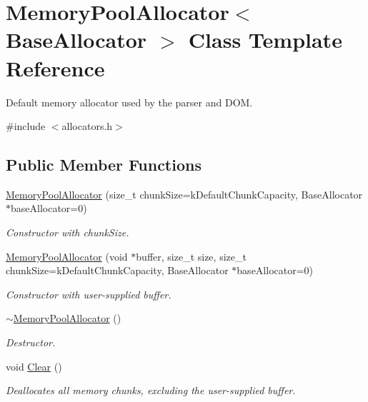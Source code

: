 \hypertarget{a01984}{}\section{Memory\+Pool\+Allocator$<$ Base\+Allocator $>$ Class Template Reference}
\label{a01984}


Default memory allocator used by the parser and D\+OM.  




{\ttfamily \#include $<$allocators.\+h$>$}

\subsection*{Public Member Functions}
\begin{DoxyCompactItemize}
\item 
\hyperlink{a01984_aeec85ac657f242ac5620115141be5209}{Memory\+Pool\+Allocator} (size\+\_\+t chunk\+Size=k\+Default\+Chunk\+Capacity, Base\+Allocator $\ast$base\+Allocator=0)
\begin{DoxyCompactList}\small\item\em Constructor with chunk\+Size. \end{DoxyCompactList}\item 
\hyperlink{a01984_a1f0d865093fdb955d956b7a445a8ddbf}{Memory\+Pool\+Allocator} (void $\ast$buffer, size\+\_\+t size, size\+\_\+t chunk\+Size=k\+Default\+Chunk\+Capacity, Base\+Allocator $\ast$base\+Allocator=0)
\begin{DoxyCompactList}\small\item\em Constructor with user-\/supplied buffer. \end{DoxyCompactList}\item 
\hyperlink{a01984_ad4eee0ef3cfe8cda31034fbce98b7a9b}{$\sim$\+Memory\+Pool\+Allocator} ()
\begin{DoxyCompactList}\small\item\em Destructor. \end{DoxyCompactList}\item 
\mbox{\label{a01984_a57bbc80e570db6110901b9a7e36dbda0}} 
void \hyperlink{a01984_a57bbc80e570db6110901b9a7e36dbda0}{Clear} ()
\begin{DoxyCompactList}\small\item\em Deallocates all memory chunks, excluding the user-\/supplied buffer. \end{DoxyCompactList}\item 

\end{DoxyCompactItemize}
